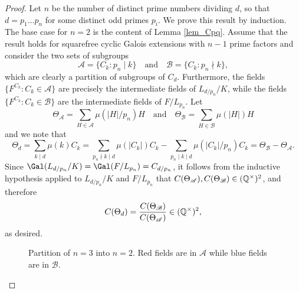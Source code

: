 \begin{proof}
    Let $n$ be the number of distinct prime numbers dividing $d$, so that $d=p_1\ldots p_n$ for some distinct odd primes $p_i$. We prove this result by induction. The base case for $n=2$ is the content of Lemma \ref{lem_Cpq}. Assume that the result holds for squarefree cyclic Galois extensions with $n-1$ prime factors and consider the two sets of subgroups
    $$\mathcal{A}=\{C_k:p_n\mid k\}\quad\text{and}\quad\mathcal{B}=\{C_k:p_n\nmid k\},$$
    which are clearly a partition of subgroups of $C_d$. Furthermore, the fields $\{F^{C_k}:C_k\in\mathcal{A}\}$ are precisely the intermediate fields of $L_{d/p_n}/K$, while the fields $\{F^{C_k}:C_k\in\mathcal{B}\}$ are the intermediate fields of $F/L_{p_n}$.
    Let 
    $$\Theta_\mathcal{A}=\sum_{H\in\mathcal{A}}\mu(|H|/p_n)H\quad\text{and}\quad\Theta_\mathcal{B}=\sum_{H\in\mathcal{B}}\mu(|H|)H$$
    and we note that
    \begin{equation}\label{eqn_theta}
        \Theta_d=\sum_{k\mid d}\mu(k)C_k=\sum_{p_n\nmid k\mid d}\mu(|C_k|)C_k-\sum_{p_n\mid k\mid d}\mu(|C_k|/p_n)C_k=\Theta_\mathcal{B}-\Theta_\mathcal{A}.
    \end{equation}
    Since $\Gal(L_{d/p_n}/K)=\Gal(F/L_{p_n})=C_{d/p_n}$, it follows from the inductive hypothesis applied to $L_{d/p_n}/K$ and $F/L_{p_n}$ that $C(\Theta_\mathcal{A}),C(\Theta_\mathcal{B})\in(\mathbb{Q}^{\times})^2$, and therefore
    $$C(\Theta_d)=\frac{C(\Theta_\mathcal{B})}{C(\Theta_\mathcal{A})}\in(\mathbb{Q}^{\times})^2,$$ 
    as desired.
    \begin{figure}[!ht]
        \centering
        \caption[short]{Partition of $n=3$ into $n=2$. Red fields are in $\mathcal{A}$ while blue fields are in $\mathcal{B}$.}
    \end{figure}
\end{proof}

